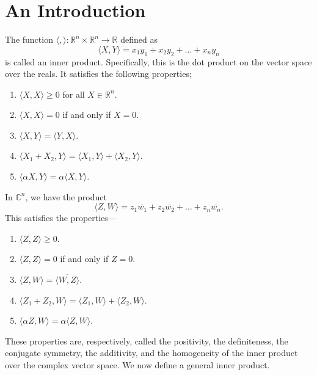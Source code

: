 \documentclass[15pt,a4paper]{book}
\theoremstyle{definition}
\newcommand{\R}{\mathbb{R}}
\newcommand{\C}{\mathbb{C}}
\newcommand{\ip}[1]{\langle #1 \rangle}
\newcommand{\conj}[1]{\overline{#1}}
\begin{document}
\section{An Introduction}
The function $\ip{,} : \R^{n} \times \R^{n} \to \R$ defined as
\begin{equation}
    \ip{X,Y} = x_{1}y_{1} + x_{2}y_{2} + \ldots + x_{n}y_{n}
\end{equation}
is called an inner product. Specifically, this is the dot product on the vector space over the reals. It satisfies the following properties;
\begin{enumerate}
    \item $\ip{X,X} \geq 0$ for all $X \in \R^{n}$.
    \item $\ip{X,X} = 0$ if and only if $X = 0$.
    \item $\ip{X,Y} = \ip{Y,X}$.
    \item $\ip{X_{1}+X_{2},Y} = \ip{X_{1},Y} + \ip{X_{2},Y}$.
    \item $\ip{\alpha X, Y} = \alpha \ip{X,Y}$.
\end{enumerate}
In $\C^{n}$, we have the product
\begin{equation}
    \ip{Z,W} = z_{1}\conj{w_{1}} + z_{2}\conj{w_{2}} + \ldots + z_{n}\conj{w_{n}}.
\end{equation}
This satisfies the properties---
\begin{enumerate}
    \item $\ip{Z,Z} \geq 0$.
    \item $\ip{Z,Z} = 0$ if and only if $Z = 0$.
    \item $\ip{Z,W} = \conj{\ip{W,Z}}$.
    \item $\ip{Z_{1}+Z_{2},W} = \ip{Z_{1},W} + \ip{Z_{2},W}$.
    \item $\ip{\alpha Z, W} = \alpha \ip{Z,W}$.
\end{enumerate}
These properties are, respectively, called the positivity, the definiteness, the conjugate symmetry, the additivity, and the homogeneity of the inner product over the complex vector space. We now define a general inner product.\\
\end{document}
